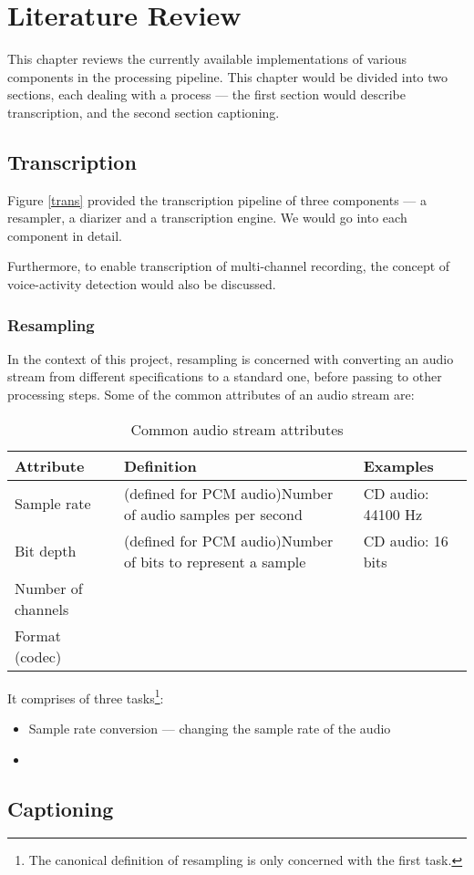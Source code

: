 \chapter{Literature Review}

This chapter reviews the currently available implementations of various
components in the processing pipeline. This chapter would be divided into
two sections, each dealing with a process --- the first section would
describe transcription, and the second section captioning.

\section{Transcription}

Figure \ref{trans} provided the transcription pipeline of three components
--- a resampler, a diarizer and a transcription engine. We would go into
each component in detail.

Furthermore, to enable transcription of multi-channel recording, the concept
of voice-activity detection would also be discussed.

\subsection{Resampling}

In the context of this project, resampling is concerned with converting an
audio stream from different specifications to a standard one, before passing to
other processing steps. Some of the common attributes of an audio stream are:

\begin{table}[H]
    \begin{tabu}{X[l]X[3]X[2]}
        \textbf{Attribute} & \textbf{Definition} & \textbf{Examples} \\
        \midrule
        Sample rate &
        (defined for PCM audio)\newline Number of audio samples per
        second &
        CD audio: 44100 Hz \\

        Bit depth &
        (defined for PCM audio)\newline Number of bits to represent
        a sample &
        CD audio: 16 bits \\
        
        Number of channels & & \\
        
        Format (codec) & &        
    \end{tabu}
    \caption{Common audio stream attributes}
\end{table}


It comprises of three tasks\footnote{
The canonical definition of resampling is only concerned with the first task.}:

\begin{itemize}
    \item Sample rate conversion --- changing the sample rate of the audio
    \item 
\end{itemize}


\section{Captioning}